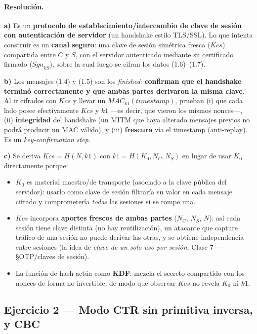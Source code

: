 \paragraph{Resolución.}
\textbf{a)} Es un \textbf{protocolo de establecimiento/intercambio de clave de sesión con
autenticación de servidor} (un handshake estilo TLS/SSL). Lo que intenta construir es un
\textbf{canal seguro}: una clave de sesión simétrica fresca ($Kcs$) compartida entre $C$ y $S$,
con el servidor autenticado mediante su certificado firmado ($\mathit{Sgn}_{kS}$), sobre la cual
luego se cifran los datos (1.6)--(1.7).

\textbf{b)} Los mensajes (1.4) y (1.5) son los \emph{finished}: \textbf{confirman que el handshake
terminó correctamente y que ambas partes derivaron la misma clave}. Al ir cifrados con $Kcs$ y
llevar un $\mathit{MAC}_{k1}(\mathit{timestamp})$, prueban (i) que cada lado posee efectivamente
$Kcs$ y $k1$ —es decir, que vieron los mismos nonces—, (ii) \textbf{integridad} del handshake
(un MITM que haya alterado mensajes previos no podrá producir un MAC válido), y (iii)
\textbf{frescura} vía el timestamp (anti-replay). Es un \emph{key-confirmation step}.

\textbf{c)} Se deriva $Kcs = H(N, k1)$ con $k1 = H(K_0, N_C, N_S)$ en lugar de usar $K_0$
directamente porque:
\begin{itemize}
\item $K_0$ es material maestro/de transporte (asociado a la clave pública del servidor): usarlo
      como clave de sesión filtraría su valor en cada mensaje cifrado y comprometería \emph{todas}
      las sesiones si se rompe una.
\item $Kcs$ incorpora \textbf{aportes frescos de ambas partes} ($N_C$, $N_S$, $N$): así cada
      sesión tiene clave distinta (no hay reutilización), un atacante que capture tráfico de una
      sesión no puede derivar las otras, y se obtiene independencia entre sesiones
      (la idea de \emph{clave de un solo uso por sesión}, Clase 7 — \S OTP/claves de sesión).
\item La función de hash actúa como \textbf{KDF}: mezcla el secreto compartido con los nonces de
      forma no invertible, de modo que observar $Kcs$ no revela $K_0$ ni $k1$.
\end{itemize}

\subsection{Ejercicio 2 — Modo CTR sin primitiva inversa, y CBC}

